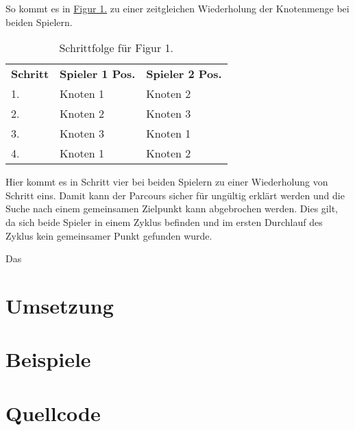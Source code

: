 \documentclass[a4paper,10pt,ngerman]{scrartcl}
\begin{document}
    So kommt es in \hyperref[fig:Figure1]{Figur 1.} zu einer zeitgleichen Wiederholung der Knotenmenge bei beiden Spielern.
    
    \begin{table}
    \centering
    \begin{tabular}{lll}
    \textbf{Schritt} & \textbf{Spieler 1 Pos.} & \textbf{Spieler 2 Pos.} \\
    1. & Knoten 1 & Knoten 2 \\
    2. & Knoten 2 & Knoten 3 \\
    3. & Knoten 3 & Knoten 1 \\
    4. & Knoten 1 & Knoten 2 \\
    \end{tabular}
    \caption{Schrittfolge für Figur 1.}
    \label{tab:Table1}
    \end{table}
    
    Hier kommt es in Schritt vier bei beiden Spielern zu einer Wiederholung von Schritt eins.
    Damit kann der Parcours sicher für ungültig erklärt werden und die Suche nach einem gemeinsamen Zielpunkt kann abgebrochen werden.
    Dies gilt, da sich beide Spieler in einem Zyklus befinden und im ersten Durchlauf des Zyklus kein gemeinsamer Punkt gefunden wurde.
    
    Das %
    



    \section{Umsetzung}\label{sec:umsetzung}


    \section{Beispiele}\label{sec:beispiele}


    \section{Quellcode}\label{sec:quellcode}\label{LastPage}
\end{document}
